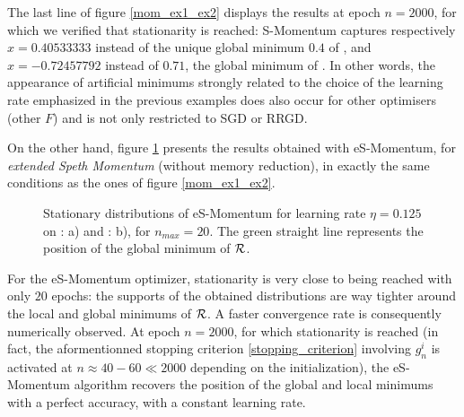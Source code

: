 \documentclass[article,authoryear,jmlmc]{beg_32}             %
\begin{document}
  The last line of figure \ref{mom_ex1_ex2} displays the results at epoch $n=2000$, for which we verified that stationarity is reached:  S-Momentum captures respectively
  $x=0.40533333$ instead of the unique global minimum $0.4$ of \exOne, 
  and $x=-0.72457792$ instead of $0.71$, the global minimum of \exTwo. 
  In other words, the appearance of artificial minimums strongly related to the choice of the learning rate emphasized in the previous examples does also occur for other optimisers
  (other $F$) and is not only restricted to SGD or RRGD. 

  On the other hand, figure \ref{speth_mom_ex1_ex2} presents the results obtained with eS-Momentum, for {\em extended Speth Momentum} {(without memory reduction)}, in exactly the same conditions as the ones of figure \ref{mom_ex1_ex2}. 
\begin{figure}[!h]
	\centering
	\scalebox{0.60}{}
	\scalebox{0.60}{}
        \caption{Stationary distributions of eS-Momentum for learning rate $\eta=0.125$ on \exOne: a) and \exTwo: b), for $n_{max}=20$. The green straight line represents the position of the global minimum of $\mathcal{R}$.}
	\label{speth_mom_ex1_ex2}
\end{figure}
For the eS-Momentum optimizer, stationarity is very close to being reached with only $20$ epochs: the supports of the obtained distributions are way tighter around the local and
global minimums of $\mathcal{R}$. A faster convergence rate is consequently numerically observed.  
  At epoch $n=2000$, for which stationarity is reached (in fact, the aformentionned stopping criterion \eqref{stopping_criterion} involving $g_n^i$ is activated at $n\approx 40 - 60 \ll 2000$ depending on the
  initialization), the eS-Momentum algorithm recovers the 
  position of the global and local minimums with a perfect accuracy, with a constant learning rate. 
\end{document}
